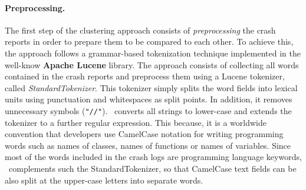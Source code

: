 \paragraph{Preprocessing.}
The first step of the clustering approach consists of \textit{preprocessing} the crash reports in order to prepare them to be compared to each other. 
To achieve this, the approach follows a grammar-based tokenization technique implemented in the well-know \textbf{Apache Lucene} \cite{lucene} library.  
The approach consists of collecting all words contained in the crash reports and preprocess them using a Lucene tokenizer, called \textit{StandardTokenizer}. 
This tokenizer simply splits the word fields into lexical units using punctuation and whitespaces as split points. In addition, it removes unnecessary symbols (\eg \texttt{"//"}).
\toolname\ converts all strings to lower-case and extends the tokenizer to a further regular expression. 
This because, it is a worldwide convention that developers use CamelCase notation for writing programming words such as names of classes, names of functions or names of variables.
Since most of the words included in the crash logs are programming language keywords, \toolname\ complements such the StandardTokenizer, so that CamelCase text fields can be also split at the upper-case letters into separate words. 

